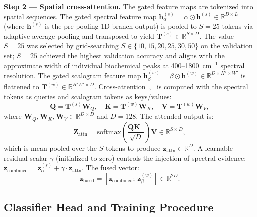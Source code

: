 \documentclass[preprint,12pt]{elsarticle}
\begin{document}
\noindent\textbf{Step 2 --- Spatial cross-attention.}
The gated feature maps are tokenized into spatial sequences. The
gated spectral feature map
$\mathbf{h}_\alpha^{(s)} = \alpha \odot \mathbf{h}^{(s)} \in \mathbb{R}^{D \times L}$
(where $\mathbf{h}^{(s)}$ is the pre-pooling 1D branch output)
is pooled to $S{=}25$ tokens via adaptive average pooling and
transposed to yield $\mathbf{T}^{(s)} \in \mathbb{R}^{S \times D}$.
The value $S{=}25$ was selected by grid-searching $S \in \{10, 15,
20, 25, 30, 50\}$ on the validation set; $S{=}25$ achieved the
highest validation accuracy and aligns with the approximate width of
individual biochemical peaks at 400--1800~cm$^{-1}$ spectral
resolution. The gated scalogram feature map
$\mathbf{h}_\beta^{(w)} = \beta \odot \mathbf{h}^{(w)} \in \mathbb{R}^{D \times H' \times W'}$
is flattened to $\mathbf{T}^{(w)} \in \mathbb{R}^{H'W' \times D}$.
Cross-attention~\cite{vaswani2017attention},~\cite{tsai2019multimodal} is computed with the
spectral tokens as queries and scalogram tokens as keys/values:
\begin{equation}
  \mathbf{Q} = \mathbf{T}^{(s)}\mathbf{W}_Q, \quad
  \mathbf{K} = \mathbf{T}^{(w)}\mathbf{W}_K, \quad
  \mathbf{V} = \mathbf{T}^{(w)}\mathbf{W}_V,
  \label{eq:qkv}
\end{equation}
where $\mathbf{W}_Q, \mathbf{W}_K, \mathbf{W}_V \in \mathbb{R}^{D
\times D}$ and $D{=}128$. The attended output is:
\begin{equation}
  \mathbf{Z}_\mathrm{attn} =
  \mathrm{softmax}\!\left(\frac{\mathbf{Q}\mathbf{K}^\top}{\sqrt{D}}
  \right)\mathbf{V} \in \mathbb{R}^{S \times D},
  \label{eq:attn}
\end{equation}
which is mean-pooled over the $S$ tokens to produce
$\mathbf{z}_\mathrm{attn} \in \mathbb{R}^{D}$. A learnable residual
scalar $\gamma$ (initialized to zero) controls the injection of
spectral evidence:
$\mathbf{z}_\mathrm{combined} = \mathbf{z}_\alpha^{(s)} + \gamma
\cdot \mathbf{z}_\mathrm{attn}$. The fused vector:
\begin{equation}
  \mathbf{z}_\mathrm{fused} =
  \left[\mathbf{z}_\mathrm{combined};\,\mathbf{z}_\beta^{(w)}\right]
  \in\mathbb{R}^{2D}.
  \label{eq:fused}
\end{equation}

\subsection{Classifier Head and Training Procedure}
\label{ssec:head_and_training}
\end{document}
